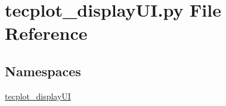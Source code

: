 \hypertarget{a00035}{}\section{tecplot\+\_\+display\+U\+I.\+py File Reference}
\label{a00035}
\subsection*{Namespaces}
\begin{DoxyCompactItemize}
\item 
 \hyperlink{a00061}{tecplot\+\_\+display\+UI}
\end{DoxyCompactItemize}
